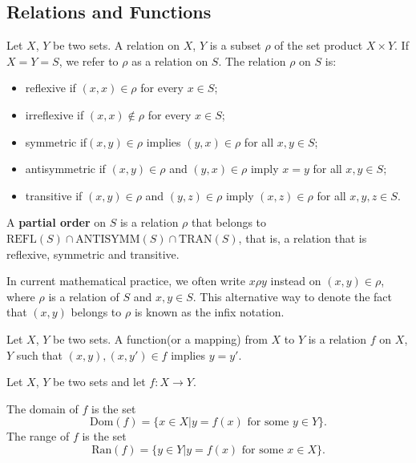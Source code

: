 \documentclass[../main.tex]{subfiles}
\begin{document}
\subsection{Relations and Functions}
\begin{purple}
\begin{definition}
Let $X$, $Y$ be two sets. A relation on $X$, $Y$ is a subset $\rho$ of the set product $X\times Y$. If $X=Y=S$, we refer to $\rho$ as a relation on $S$. The relation $\rho$ on $S$ is: 
\begin{itemize}
    \item reflexive if $(x,x)\in\rho$ for every $x\in S$;
    \item irreflexive if $(x, x) \notin \rho$ for every $x\in S$;
    \item symmetric if$(x,y)\in\rho$ implies $(y,x)\in\rho$ for all $x,y\in S$;
    \item antisymmetric if $(x,y)\in\rho$ and $(y,x)\in\rho$ imply $x=y$ for all $x,y\in S$;
    \item transitive if $(x,y)\in\rho$ and $(y,z)\in\rho$ imply $(x,z)\in \rho$ for all $x, y, z\in S$.
\end{itemize}
\end{definition}
\end{purple}

A \textbf{partial order} on $S$ is a relation $\rho$ that belongs to $\text{REFL}(S)\cap\text{ANTISYMM}(S)\cap\text{TRAN}(S)$, that is, a relation that is reflexive, symmetric and transitive.

In current mathematical practice, we often write $x\rho y$ instead on $(x,y)\in \rho$, where $\rho$ is a relation of $S$ and $x,y\in S$. This alternative way to denote the fact that $(x,y)$ belongs to $\rho$ is known as the infix notation.

\begin{purple}
\begin{definition}
Let $X$, $Y$ be two sets. A function(or a mapping) from $X$ to $Y$ is a relation $f$ on $X$, $Y$ such that $(x, y), (x,y')\in f$ implies $y=y'$.

Let $X$, $Y$ be two sets and let $f:X\rightarrow Y$. 

The domain of $f$ is the set 
$$
\text{Dom}(f)=\{x\in X|y=f(x)\text{ for some } y\in Y\}.
$$
The range of $f$ is the set 
$$
\text{Ran}(f)=\{y\in Y|y=f(x) \text{ for some } x \in X\}.
$$

\end{definition}
\end{purple}
\end{document}

